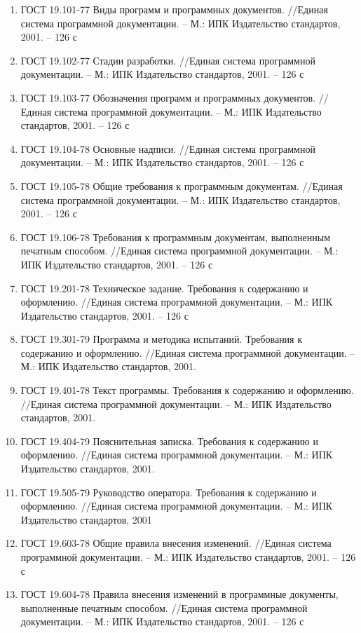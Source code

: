 \documentclass{../TechDoc}
\begin{document}
    \begin{enumerate}
        \item ГОСТ 19.101-77 Виды программ и программных документов. //Единая система программной документации. – М.: ИПК Издательство стандартов, 2001. – 126 с
        \item ГОСТ 19.102-77 Стадии разработки. //Единая система программной документации. – М.: ИПК Издательство стандартов, 2001. – 126 с
        \item ГОСТ 19.103-77 Обозначения программ и программных документов. //Единая система программной документации. – М.: ИПК Издательство стандартов, 2001. – 126 с
        \item ГОСТ 19.104-78 Основные надписи. //Единая система программной документации. – М.: ИПК Издательство стандартов, 2001. – 126 с
        \item ГОСТ 19.105-78 Общие требования к программным документам. //Единая система программной документации. – М.: ИПК Издательство стандартов, 2001. – 126 с
        \item ГОСТ 19.106-78 Требования к программным документам, выполненным печатным способом. //Единая система программной документации. – М.: ИПК Издательство стандартов, 2001. – 126 с
        \item ГОСТ 19.201-78 Техническое задание. Требования к содержанию и оформлению. //Единая система программной документации. – М.: ИПК Издательство стандартов, 2001. – 126 с
        \item ГОСТ 19.301-79 Программа и методика испытаний. Требования к содержанию и оформлению. //Единая система программной документации. – М.: ИПК Издательство стандартов, 2001.
        \item ГОСТ 19.401-78 Текст программы. Требования к содержанию и оформлению. //Единая система программной документации. – М.: ИПК Издательство стандартов, 2001.
        \item ГОСТ 19.404-79 Пояснительная записка. Требования к содержанию и оформлению. //Единая система программной документации. – М.: ИПК Издательство стандартов, 2001.
        \item ГОСТ 19.505-79 Руководство оператора. Требования к содержанию и оформлению. //Единая система программной документации. – М.: ИПК Издательство стандартов, 2001
        \item ГОСТ 19.603-78 Общие правила внесения изменений. //Единая система программной документации. – М.: ИПК Издательство стандартов, 2001. – 126 с
        \item ГОСТ 19.604-78 Правила внесения изменений в программные документы, выполненные печатным способом. //Единая система программной документации. – М.: ИПК Издательство стандартов, 2001. – 126 с
    \end{enumerate}

    \clearpage

    \registrationList
\end{document}
